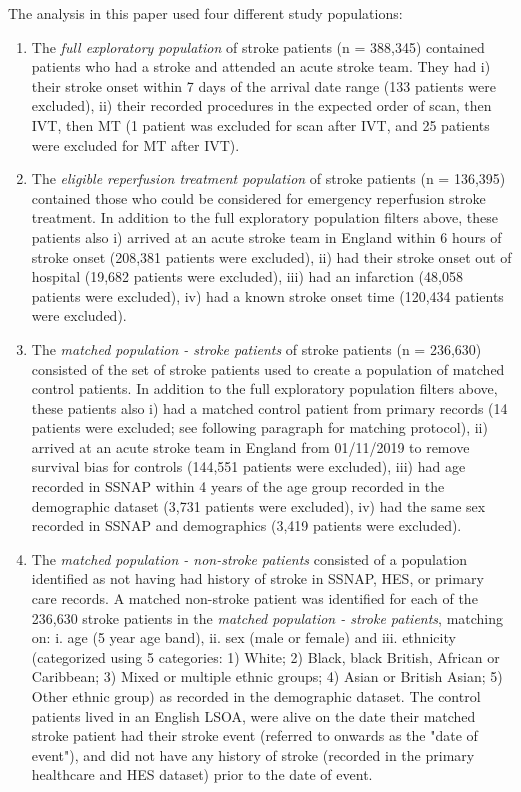 The analysis in this paper used four different study populations:

\begin{enumerate}
    \item The \emph{full exploratory population} of stroke patients (n = 388,345) contained patients who had a stroke and attended an acute stroke team. They had i) their stroke onset within 7 days of the arrival date range (133 patients were excluded), ii) their recorded procedures in the expected order of scan, then IVT, then MT (1 patient was excluded for scan after IVT, and 25 patients were excluded for MT after IVT).
    
    \item The \emph{eligible reperfusion treatment population} of stroke patients (n = 136,395) contained those who could be considered for emergency reperfusion stroke treatment. In addition to the full exploratory population filters above, these patients also i) arrived at an acute stroke team in England within 6 hours of stroke onset (208,381 patients were excluded), ii) had their stroke onset out of hospital (19,682 patients were excluded), iii) had an infarction (48,058 patients were excluded), iv) had a known stroke onset time (120,434 patients were excluded).
    
    \item The \emph{matched population - stroke patients} of stroke patients (n = 236,630) consisted of the set of stroke patients used to create a population of matched control patients. In addition to the full exploratory population filters above, these patients also i) had a matched control patient from primary records (14 patients were excluded; see following paragraph for matching protocol), ii) arrived at an acute stroke team in England from 01/11/2019 to remove survival bias for controls (144,551 patients were excluded), iii) had age recorded in SSNAP within 4 years of the age group recorded in the demographic dataset (3,731 patients were excluded), iv) had the same sex recorded in SSNAP and demographics (3,419 patients were excluded).

    \item The \emph{matched population - non-stroke patients} consisted of a population identified as not having had history of stroke in SSNAP, HES, or primary care records. A matched non-stroke patient was identified for each of the 236,630 stroke patients in the \textit{matched population - stroke patients}, matching on: i. age (5 year age band), ii. sex (male or female) and iii. ethnicity (categorized using 5 categories: 1) White; 2) Black, black British, African or Caribbean; 3) Mixed or multiple ethnic groups; 4) Asian or British Asian; 5) Other ethnic group) as recorded in the demographic dataset. The control patients lived in an English LSOA, were alive on the date their matched stroke patient had their stroke event (referred to onwards as the "date of event"), and did not have any history of stroke (recorded in the primary healthcare and HES dataset) prior to the date of event.
    
\end{enumerate}

